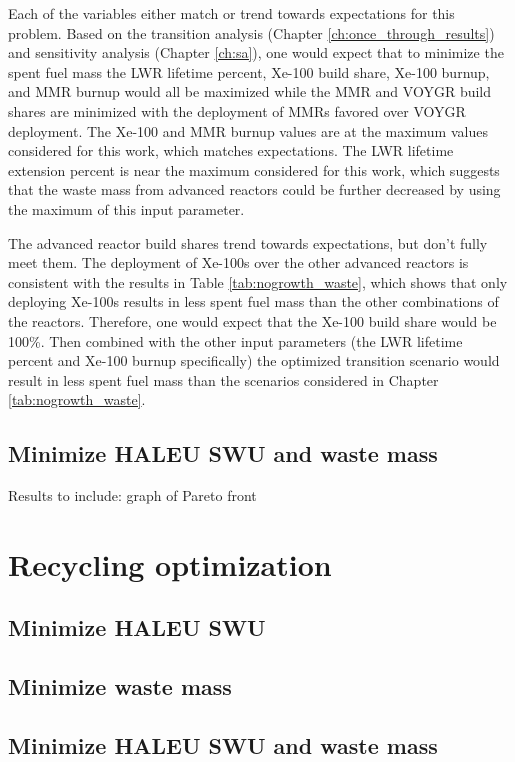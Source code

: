 Each of the variables either match or trend towards expectations for this problem. 
Based on the transition analysis (Chapter \ref{ch:once_through_results}) and 
sensitivity analysis (Chapter \ref{ch:sa}), one would expect that to minimize 
the spent fuel mass the \gls{LWR} lifetime percent, Xe-100 build share, 
Xe-100 burnup, and \gls{MMR} burnup would all be maximized while the \gls{MMR} 
and VOYGR build shares are minimized with the deployment of \glspl{MMR} favored 
over VOYGR deployment. The Xe-100 and \gls{MMR} burnup values are at the maximum 
values considered for this work, which matches expectations. The \gls{LWR} lifetime 
extension percent is near the maximum considered for this work, which suggests that 
the waste mass from advanced reactors could be further decreased by using the 
maximum of this input parameter. 

The advanced reactor build shares trend towards expectations, but don't fully 
meet them. The deployment of Xe-100s over the other advanced reactors is consistent 
with the results in Table \ref{tab:nogrowth_waste}, which shows that only deploying 
Xe-100s results in less spent fuel mass than the other combinations of the reactors. 
Therefore, one would expect that the Xe-100 build share would be 100\%. Then combined 
with the other input parameters (the \gls{LWR} lifetime percent and Xe-100 burnup 
specifically) the optimized transition scenario would result in less spent fuel 
mass than the scenarios considered in Chapter \ref{tab:nogrowth_waste}.

\subsection{Minimize HALEU SWU and waste mass}

Results to include: graph of Pareto front

\section{Recycling optimization}
\subsection{Minimize HALEU SWU}

\subsection{Minimize waste mass}

\subsection{Minimize HALEU SWU and waste mass}

